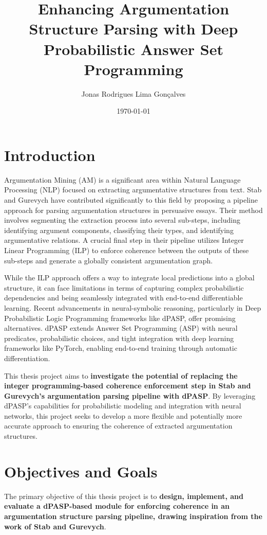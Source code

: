 \documentclass{article}
\title{Enhancing Argumentation Structure Parsing with Deep Probabilistic Answer
Set Programming}
\author{Jonas Rodrigues Lima Gonçalves}
\date{\today}
\begin{document}
\maketitle

\section{Introduction}

Argumentation Mining (AM) is a significant area within Natural Language 
Processing (NLP) focused on extracting argumentative structures from text. Stab
and Gurevych have contributed significantly to this field by proposing a 
pipeline approach for parsing argumentation structures in persuasive essays.
Their method involves segmenting the extraction process into several sub-steps,
 including identifying argument components, classifying their types, and
 identifying argumentative relations. A crucial final step in their pipeline
 utilizes Integer Linear Programming (ILP) to enforce coherence between the
 outputs of these sub-steps and generate a globally consistent argumentation
 graph.

While the ILP approach offers a way to integrate local predictions into a global
 structure, it can face limitations in terms of capturing complex probabilistic
 dependencies and being seamlessly integrated with end-to-end differentiable
 learning. Recent advancements in neural-symbolic reasoning, particularly in
 Deep Probabilistic Logic Programming frameworks like dPASP, offer promising
 alternatives. dPASP extends Answer Set Programming (ASP) with neural
 predicates, probabilistic choices, and tight integration with deep learning
 frameworks like PyTorch, enabling end-to-end training through automatic
 differentiation.

This thesis project aims to \textbf{investigate the potential of replacing the
integer programming-based coherence enforcement step in Stab and Gurevych's
argumentation parsing pipeline with dPASP}. By leveraging dPASP's capabilities
for probabilistic modeling and integration with neural networks, this project
seeks to develop a more flexible and potentially more accurate approach to
ensuring the coherence of extracted argumentation structures.

\section{Objectives and Goals}

The primary objective of this thesis project is to \textbf{design, implement,
and evaluate a dPASP-based module for enforcing coherence in an argumentation
structure parsing pipeline, drawing inspiration from the work of Stab and
Gurevych}.
\end{document}

